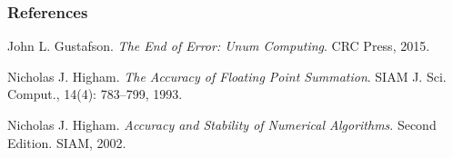 \begin{frame}

\frametitle{References}

\footnotesize

\begin{thebibliography}{9}

 John L. Gustafson. \emph{The End of
Error: Unum Computing}. CRC Press, 2015.

 Nicholas J. Higham. \emph{The Accuracy of
Floating Point Summation}. SIAM J. Sci. Comput., 14(4): 783--799, 1993.

 Nicholas J. Higham. \emph{Accuracy and
Stability of Numerical Algorithms}. Second Edition. SIAM, 2002.

\end{thebibliography}

\end{frame}
